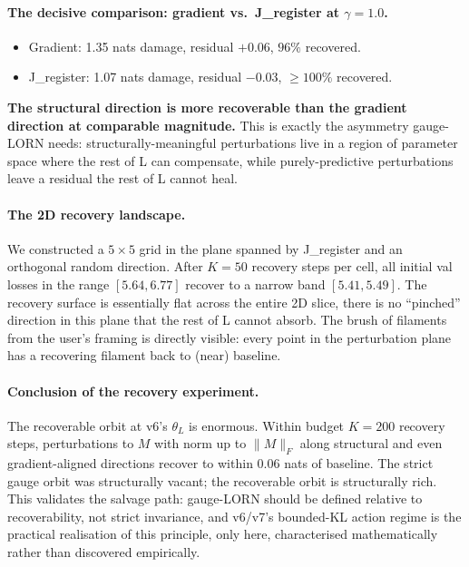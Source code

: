 \documentclass[11pt, a4paper]{article}
\theoremstyle{plain}
\theoremstyle{definition}
\theoremstyle{remark}
\begin{document}
\paragraph{The decisive comparison: gradient vs.\ J\_register at $\gamma = 1.0$.}
\begin{itemize}[nosep]
\item Gradient: 1.35 nats damage, residual $+0.06$, $96\%$ recovered.
\item J\_register: 1.07 nats damage, residual $-0.03$, $\geq 100\%$ recovered.
\end{itemize}
\textbf{The structural direction is more recoverable than the gradient direction at comparable magnitude.}
This is exactly the asymmetry gauge-LORN needs: structurally-meaningful perturbations live in a region of parameter space where the rest of L can compensate, while purely-predictive perturbations leave a residual the rest of L cannot heal.

\paragraph{The 2D recovery landscape.}
We constructed a $5 \times 5$ grid in the plane spanned by J\_register and an orthogonal random direction.
After $K = 50$ recovery steps per cell, all initial val losses in the range $[5.64, 6.77]$ recover to a narrow band $[5.41, 5.49]$.
The recovery surface is essentially flat across the entire 2D slice, there is no ``pinched'' direction in this plane that the rest of L cannot absorb.
The brush of filaments from the user's framing is directly visible: every point in the perturbation plane has a recovering filament back to (near) baseline.

\paragraph{Conclusion of the recovery experiment.}
The recoverable orbit at v6's $\theta_L$ is enormous.
Within budget $K = 200$ recovery steps, perturbations to $M$ with norm up to $\|M\|_F$ along structural and even gradient-aligned directions recover to within $0.06$ nats of baseline.
The strict gauge orbit was structurally vacant; the recoverable orbit is structurally rich.
This validates the salvage path: gauge-LORN should be defined relative to recoverability, not strict invariance, and v6/v7's bounded-KL action regime is the practical realisation of this principle, only here, characterised mathematically rather than discovered empirically.
\end{document}
